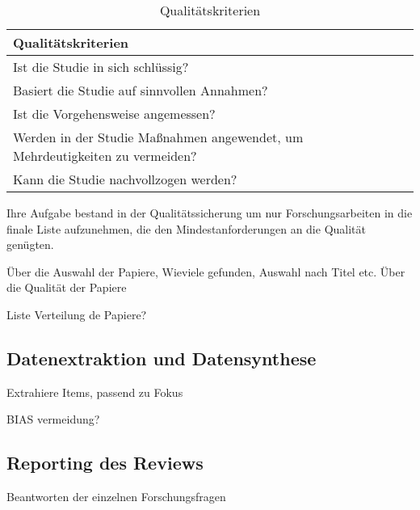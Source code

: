\begin{table}[!ht]
\renewcommand{\arraystretch}{1.3}
\centering
\begin{threeparttable}
\begin{tabularx}{\columnwidth}{@{}XX@{}}
\toprule
Qualitätskriterien \\ \midrule
Ist die Studie in sich schlüssig? \\
Basiert die Studie auf sinnvollen Annahmen? \\
Ist die Vorgehensweise angemessen? \\
Werden in der Studie Maßnahmen angewendet, um Mehrdeutigkeiten zu vermeiden? \\
Kann die Studie nachvollzogen werden? \\
\bottomrule
\end{tabularx}
\medskip
\end{threeparttable}
\caption{Qualitätskriterien}
\label{tab:qualitaetskriterien_review}
\end{table}

Ihre Aufgabe bestand in der Qualitätssicherung um nur Forschungsarbeiten in die finale Liste aufzunehmen, die den Mindestanforderungen an die Qualität genügten.



Über die Auswahl der Papiere, Wieviele gefunden, Auswahl nach Titel etc.
Über die Qualität der Papiere

Liste Verteilung de Papiere?

\subsection{Datenextraktion und Datensynthese}

Extrahiere Items, passend zu Fokus



BIAS vermeidung?

\subsection{Reporting des Reviews}

Beantworten der einzelnen Forschungsfragen

